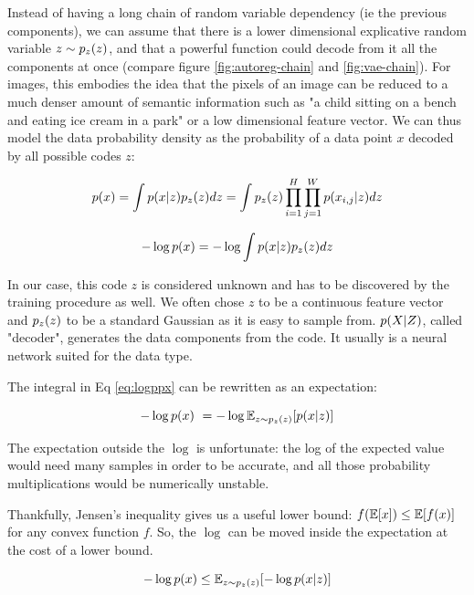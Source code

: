 Instead of having a long chain of random variable dependency (ie the previous components), we can assume that there is a lower dimensional explicative random variable $z \sim p_z(z)$, and that a powerful function could decode from it all the components at once (compare figure \ref{fig:autoreg-chain} and \ref{fig:vae-chain}). For images, this embodies the idea that the pixels of an image can be reduced to a much denser amount of semantic information such as "a child sitting on a bench and eating ice cream in a park" or a low dimensional feature vector. We can thus model the data probability density as the probability of a data point $x$ decoded by all possible codes $z$:


\begin{equation}
    p(x) = \int p(x | z)p_z(z) dz = \int p_z(z) \prod_{i=1}^H \prod_{j=1}^W p(x_{i,j} | z) dz
\end{equation}

\begin{equation}
\label{eq:logppx}
    - \log p(x) = - \log \int p(x | z) p_z(z) dz
\end{equation}

In our case, this code $z$ is considered unknown and has to be discovered by the training procedure as well. We often chose $z$ to be a continuous feature vector and $p_z(z)$ to be a standard Gaussian as it is easy to sample from. $p(X | Z)$, called "decoder", generates the data components from the code. It usually is a neural network suited for the data type.

The integral in Eq \ref{eq:logppx} can be rewritten as an expectation: 

\begin{equation}
    - \log p(x) ~= - \log \mathbb{E}_{z \sim p_z(z)}[p(x| z)]
\end{equation}

The expectation outside the $\log$ is unfortunate: the log of the expected value would need many samples in order to be accurate, and all those probability multiplications would be numerically unstable.

Thankfully, Jensen's inequality gives us a useful lower bound: $f(\mathbb{E}[x]) \leq \mathbb{E}[f(x)]$ for any convex function $f$. So, the $\log$ can be moved inside the expectation at the cost of a lower bound.

\begin{equation}
    - \log p(x) \leq \mathbb{E}_{z \sim p_z(z)} [- \log  p(x | z) ]
\end{equation}

